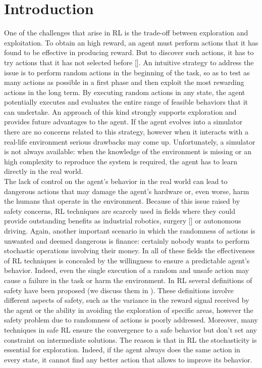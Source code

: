 \chapter{Introduction} \label{ch:intro}

One of the challenges that arise in \acf{RL} is the trade-off between exploration and exploitation. To obtain an high reward, an agent must perform actions that it has found to be effective in producing reward. But to discover such actions, it has to try actions that it has not selected before [\cite{sutton2018reinforcement}]. An intuitive strategy to address the issue is to perform random actions in the beginning of the task, so as to test as many actions as possible in a first phase and then exploit the most rewarding actions in the long term. By executing random actions in any state, the agent potentially executes and evaluates the entire range of feasible behaviors that it can undertake. An approach of this kind strongly supports exploration and provides future advantages to the agent. If the agent evolves into a simulator there are no concerns related to this strategy, however when it interacts with a real-life environment serious drawbacks may come up. Unfortunately, a simulator is not always available: when the knowledge of the environment is missing or an high complexity to reproduce the system is required, the agent has to learn directly in the real world. \\
\newline
The lack of control on the agent's behavior in the real world can lead to dangerous actions that may damage the agent's hardware or, even worse, harm the humans that operate in the environment. Because of this issue raised by safety concerns, \ac{RL} techniques are scarcely used in fields where they could provide outstanding benefits as industrial robotics, surgery [\cite{baek2018PathPlanning}] or autonomous driving. Again, another important scenario in which the randomness of actions is unwanted and deemed dangerous is finance: certainly nobody wants to perform stochastic operations involving their money. In all of these fields the effectiveness of \ac{RL} techniques is concealed by the willingness to ensure a predictable agent's behavior. Indeed, even the single execution of a random and unsafe action may cause a failure in the task or harm the environment. In \ac{RL} several definitions of safety have been proposed (we discuss them in ). These definitions involve different aspects of safety, such as the variance in the reward signal received by the agent or the ability in avoiding the exploration of specific areas, however the safety problem due to randomness of actions is poorly addressed. Moreover, many techniques in safe \ac{RL} ensure the convergence to a safe behavior but don't set any constraint on intermediate solutions. The reason is that in \ac{RL} the stochasticity is essential for exploration. Indeed, if the agent always does the same action in every state, it cannot find any better action that allows to improve its behavior.\\
